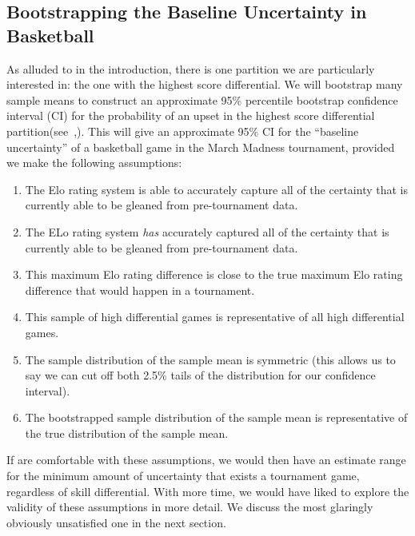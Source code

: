 \documentclass{article}
\begin{document}
\subsection{Bootstrapping the Baseline Uncertainty in Basketball}\label{bootstrapping}
As alluded to in the introduction, there is one partition we are particularly interested in: the one with the highest score differential. We will bootstrap many sample means to construct an approximate 95\% percentile bootstrap confidence interval (CI) for the probability of an upset in the highest score differential partition(see~\cite{uchicagoPercentileBootstrap},\cite{hesterberg_bootstrap_2015}). This will give an approximate 95\% CI for the ``baseline uncertainty'' of a basketball game in the March Madness tournament, provided we make the following assumptions:
\begin{enumerate}
    \item The Elo rating system is able to accurately capture all of the certainty that is currently able to be gleaned from pre-tournament data.
    \item The ELo rating system \textit{has} accurately captured all of the certainty that is currently able to be gleaned from pre-tournament data.
    \item This maximum Elo rating difference is close to the true maximum Elo rating difference that would happen in a tournament. 
    \item This sample of high differential games is representative of all high differential games.
    \item The sample distribution of the sample mean is symmetric (this allows us to say we can cut off both 2.5\% tails of the distribution for our confidence interval).
    \item The bootstrapped sample distribution of the sample mean is representative of the true distribution of the sample mean.
\end{enumerate}

If are comfortable with these assumptions, we would then have an estimate range for the minimum amount of uncertainty that exists a tournament game, regardless of skill differential. With more time, we would have liked to explore the validity of these assumptions in more detail. We discuss the most glaringly obviously unsatisfied one in the next section.


\end{document}
